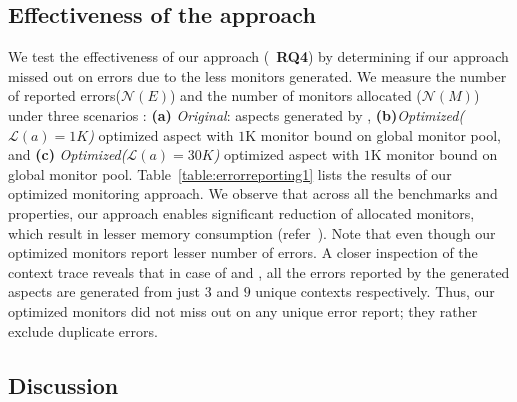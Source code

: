 \subsection{Effectiveness of the approach}
\label{sec:evaluation:effectiveness}


We test the effectiveness of our approach (\ie\ \textbf{RQ4}) by determining 
if our approach missed out on errors due to the less monitors generated. We 
measure the number of reported errors($\mathcal{N}(E)$) and the number of 
monitors allocated ($\mathcal{N}(M)$) under three scenarios : \textbf{(a)}
\emph{Original}: aspects generated by \javamop, 
\textbf{(b)}\emph{Optimized($\mathcal{L}(a) = 1K$)} optimized aspect with $1$K 
monitor bound on global monitor pool, and \textbf{(c)} 
\emph{Optimized($\mathcal{L}(a) = 30K$)} optimized aspect with $1$K monitor
bound on global monitor pool. Table~\ref{table:errorreporting1} lists the 
results of our optimized monitoring approach. We observe that across all the 
benchmarks and properties, our approach enables significant reduction of 
allocated monitors, which result in lesser memory consumption 
(refer~). Note that even though our optimized 
monitors report lesser number of errors. A closer inspection of the context 
trace reveals that in case of \bloat and \avrora, all the errors
reported by the \javamop generated aspects are generated from just $3$ and $9$ 
unique contexts respectively. Thus, our optimized monitors did not miss out on 
any unique error report; they rather exclude duplicate errors.

\subsection{Discussion}
\label{sec:discussion}


